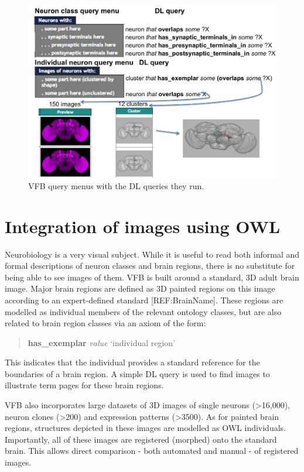 \documentclass[runningheads,a4paper]{llncs}
\begin{document}
\begin{figure}
\centering
\includegraphics[width=120mm]{images/Query_menus_DL_images.png}
\caption{VFB query menus with the DL queries they run.}
\label{fig:Query_menus_DL_images}
\end{figure}

\section{Integration of images using OWL}

Neurobiology is a very visual subject.  While it is useful to read
both informal and formal descriptions of neuron classes and brain
regions, there is no substitute for being able to see images of them.
VFB is built around a standard, 3D adult brain image.  Major brain
regions are defined as 3D painted regions on this image according to
an expert-defined standard [REF:BrainName].  These regions are modelled as
individual members of the relevant ontology classes, but are also
related to brain region classes via an axiom of the form:

\begin{quote}
\textbf{has\_exemplar} \textit{value} `individual region'
\end{quote}

This indicates that the individual provides a standard reference for
the boundaries of a brain region.  A simple DL query is used to find
images to illustrate term pages for these brain regions.

VFB also incorporates large datasets of 3D images of single neurons
(\textgreater 16,000), neuron clones (\textgreater 200) and expression
patterns (\textgreater 3500). As for painted brain regions, structures
depicted in these images are modelled as OWL individuals.
Importantly, all of these images are registered (morphed) onto the
standard brain. This allows direct comparison - both automated and
manual  - of registered images. 
\end{document}

